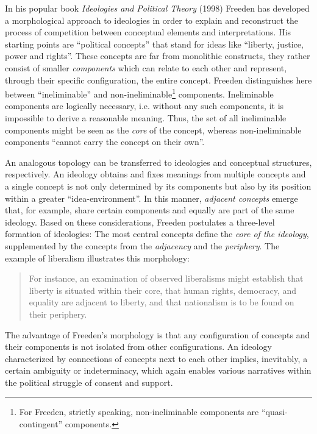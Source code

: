 \documentclass[a4paper]{scrreprt}
\begin{document}
In his popular book {\em Ideologies and Political Theory} (1998) Freeden has developed a morphological approach to ideologies in order to explain and reconstruct the process of competition between conceptual elements and interpretations. His starting points are ``political concepts'' that stand for ideas like ``liberty, justice, power and rights''. \cite[p.~54]{freeden:1998} These concepts are far from monolithic constructs, they rather consist of smaller {\em components} which can relate to each other and represent, through their specific configuration, the entire concept. Freeden distinguishes here between ``ineliminable'' and non-ineliminable\footnote{For Freeden, strictly speaking, non-ineliminable components are ``quasi-contingent'' components.} components. Ineliminable components are logically necessary, i.e. without any such components, it is impossible to derive a reasonable meaning. Thus, the set of all ineliminable components might be seen as the {\em core} of the concept, whereas non-ineliminable components ``cannot carry the concept on their own''. \cite[p.~62]{freeden:1998}\par
An analogous topology can be transferred to ideologies and conceptual structures, respectively. An ideology obtains and fixes meanings from multiple concepts and a single concept is not only determined by its components but also by its position within a greater ``idea-environment''. \cite[p.~67]{freeden:1998} In this manner, {\em adjacent concepts} emerge that, for example, share certain components and equally are part of the same ideology. Based on these considerations, Freeden postulates a three-level formation of ideologies: The most central concepts define the {\em core of the ideology}, supplemented by the concepts from the {\em adjacency} and the {\em periphery}. The example of liberalism illustrates this morphology:
\begin{quote}
    For instance, an examination of observed liberalisms might establish that liberty is situated within their core, that human rights, democracy, and equality are adjacent to liberty, and that nationalism is to be found on their periphery. \cite[p.~77]{freeden:1998}
\end{quote}
The advantage of Freeden’s morphology is that any configuration of concepts and their components is not isolated from other configurations. An ideology characterized by connections of concepts next to each other implies, inevitably, a certain ambiguity or indeterminacy, which again enables various narratives within the political struggle of consent and support. \cite[p.~155]{lembcke:2014}
\end{document}
